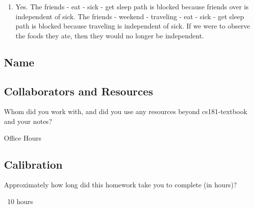 \documentclass[submit]{harvardml}
\begin{document}
\begin{enumerate}
    \item Yes. The friends - eat - sick - get sleep path is blocked because friends over is independent of sick. The friends - weekend - traveling - eat - sick - get sleep path is blocked because traveling is independent of sick. If we were to observe the foods they ate, then they would no longer be independent.
    
\end{enumerate}

\newpage
\subsection*{Name}

\subsection*{Collaborators and Resources}
Whom did you work with, and did you use any resources beyond cs181-textbook and your notes?

Office Hours

\subsection*{Calibration}
Approximately how long did this homework take you to complete (in hours)? 

~10 hours
\end{document}
